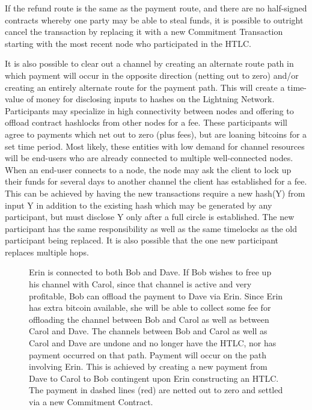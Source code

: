 \documentclass[letterpaper,11pt]{article}
\begin{document}
If the refund route is the same as the payment route, and there are no
half-signed contracts whereby one party may be able to steal funds, it is
possible to outright cancel the transaction by replacing it with a new
Commitment Transaction starting with the most recent node who participated in
the HTLC.

It is also possible to clear out a channel by creating an alternate route path
in which payment will occur in the opposite direction (netting out to zero)
and/or creating an entirely alternate route for the payment path. This will
create a time-value of money for disclosing inputs to hashes on the Lightning
Network. Participants may specialize in high connectivity between nodes and
offering to offload contract hashlocks from other nodes for a fee. These
participants will agree to payments which net out to zero (plus fees), but are
loaning bitcoins for a set time period. Most likely, these entities with low
demand for channel resources will be end-users who are already connected to
multiple well-connected nodes. When an end-user connects to a node, the node
may ask the client to lock up their funds for several days to another channel
the client has established for a fee. This can be achieved by having the new
transactions require a new hash(Y) from input Y in addition to the existing
hash which may be generated by any participant, but must disclose Y only after
a full circle is established. The new participant has the same responsibility
as well as the same timelocks as the old participant being replaced. It is also
possible that the one new participant replaces multiple hops.

\begin{figure}[H]
	\caption{Erin is connected to both Bob and Dave. If Bob wishes to free
		up his channel with Carol, since that channel is active and
		very profitable, Bob can offload the payment to Dave via Erin.
		Since Erin has extra bitcoin available, she will be able to
		collect some fee for offloading the channel between Bob and
		Carol as well as between Carol and Dave. The channels between
		Bob and Carol as well as Carol and Dave are undone and no
		longer have the HTLC, nor has payment occurred on that path.
		Payment will occur on the path involving Erin. This is achieved
		by creating a new payment from Dave to Carol to Bob contingent
		upon Erin constructing an HTLC. The payment in dashed lines
		(red) are netted out to zero and settled via a new Commitment
		Contract.
	}
\end{figure}
\end{document}
